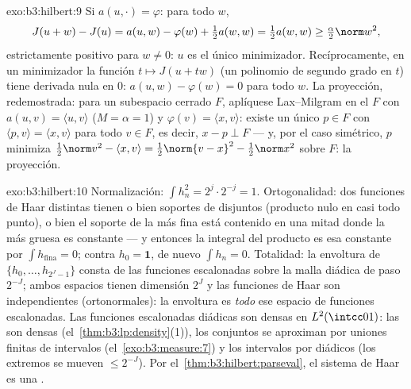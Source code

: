 \begin{solution}{exo:b3:hilbert:9}
Si $a(u, \cdot) = \varphi$: para todo $w$,
\[
J(u + w) - J(u) = a(u, w) - \varphi(w) + \tfrac12a(w,w)
= \tfrac12a(w,w) \geq \tfrac\alpha2\norm w^2,
\]
estrictamente positivo para $w \neq 0$: $u$ es el único minimizador.
Recíprocamente, en un minimizador la función $t \mapsto J(u + tw)$ (un
polinomio de segundo grado en $t$) tiene derivada nula en $0$:
$a(u, w) - \varphi(w) = 0$ para todo $w$. La proyección, redemostrada:
para un subespacio cerrado $F$, aplíquese Lax--Milgram en el
 $F$ con
$a(u,v) = \langle u, v\rangle$ ($M = \alpha = 1$) y
$\varphi(v) = \langle x, v\rangle$: existe un único $p \in F$ con
$\langle p, v\rangle = \langle x,
v\rangle$ para todo $v \in F$, es decir, $x - p \perp F$ --- y, por el
caso simétrico, $p$ minimiza $\frac12\norm v^2 - \langle
x, v\rangle = \frac12\norm{v - x}^2 - \frac12\norm x^2$ sobre $F$: la
proyección.
\end{solution}

\begin{solution}{exo:b3:hilbert:10}
Normalización: $\int h_n^2 = 2^j\cdot 2^{-j} = 1$. Ortogonalidad: dos
funciones de Haar distintas tienen o bien soportes de
 disjuntos (producto nulo
en casi todo punto), o bien el soporte de la más fina está contenido en
una mitad donde la más gruesa es constante --- y entonces la integral
del producto es esa constante por $\int h_{\text{fina}} = 0$; contra
$h_0
= \mathbf 1$, de nuevo $\int h_n = 0$. Totalidad: la envoltura de
$\{h_0, \dots, h_{2^J-1}\}$ consta de las funciones escalonadas sobre la
malla diádica de paso $2^{-J}$; ambos espacios tienen dimensión $2^J$ y
las funciones de Haar son independientes (ortonormales): la envoltura es
\emph{todo} ese espacio de funciones escalonadas. Las funciones
escalonadas diádicas son densas en $L^2(\intcc01)$: las
 son densas
(el~\cref{thm:b3:lp:density}(1)), los conjuntos
 se aproximan por uniones
finitas de intervalos (el~\cref{exo:b3:measure:7}) y los intervalos por
diádicos (los extremos se mueven $\leq 2^{-J}$). Por
el~\cref{thm:b3:hilbert:parseval}, el sistema de Haar es una
.
\end{solution}

